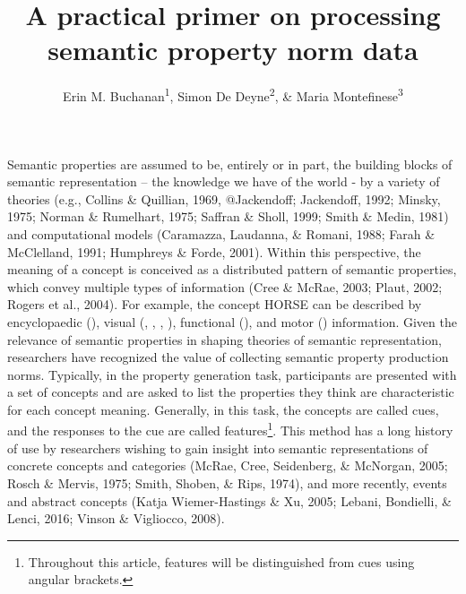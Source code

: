 \documentclass[man]{apa6}
\title{A practical primer on processing semantic property norm data}
\author{Erin M. Buchanan\textsuperscript{1}, Simon De Deyne\textsuperscript{2}, \& Maria Montefinese\textsuperscript{3}}
\date{}
\affiliation{
\vspace{0.5cm}
\textsuperscript{1} Harrisburg University of Science and Technology\\\textsuperscript{2} The University of Melbourne\\\textsuperscript{3} University of Padua}
\let\rmarkdownfootnote\footnote%
\def\footnote{\protect\rmarkdownfootnote}
\begin{document}
\maketitle

Semantic properties are assumed to be, entirely or in part, the building blocks of semantic representation -- the knowledge we have of the world - by a variety of theories (e.g., Collins \& Quillian, 1969, @Jackendoff; Jackendoff, 1992; Minsky, 1975; Norman \& Rumelhart, 1975; Saffran \& Sholl, 1999; Smith \& Medin, 1981) and computational models (Caramazza, Laudanna, \& Romani, 1988; Farah \& McClelland, 1991; Humphreys \& Forde, 2001). Within this perspective, the meaning of a concept is conceived as a distributed pattern of semantic properties, which convey multiple types of information (Cree \& McRae, 2003; Plaut, 2002; Rogers et al., 2004). For example, the concept HORSE can be described by encyclopaedic (), visual (, , , ), functional (), and motor () information. Given the relevance of semantic properties in shaping theories of semantic representation, researchers have recognized the value of collecting semantic property production norms. Typically, in the property generation task, participants are presented with a set of concepts and are asked to list the properties they think are characteristic for each concept meaning. Generally, in this task, the concepts are called cues, and the responses to the cue are called features\footnote{Throughout this article, features will be distinguished from cues using angular brackets.}. This method has a long history of use by researchers wishing to gain insight into semantic representations of concrete concepts and categories (McRae, Cree, Seidenberg, \& McNorgan, 2005; Rosch \& Mervis, 1975; Smith, Shoben, \& Rips, 1974), and more recently, events and abstract concepts (Katja Wiemer-Hastings \& Xu, 2005; Lebani, Bondielli, \& Lenci, 2016; Vinson \& Vigliocco, 2008).
\end{document}
